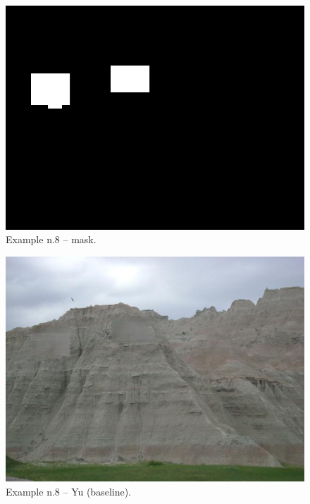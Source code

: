 \documentclass[a4paper, 11pt]{article}
\begin{document}
\begin{figure}
    \centering
    \includegraphics[width=.95\linewidth]{documentation/img/masks/0084_mask.png}
    \caption{Example n.8 -- mask.}
    \label{img:ex_n.8_mask}
\end{figure}
\begin{figure}
    \centering
    \includegraphics[width=.95\linewidth]{documentation/img/baseline/0084.png}
    \caption{Example n.8 -- Yu (baseline).}
    \label{img:ex_n.8_mask}
\end{figure}
\end{document}
